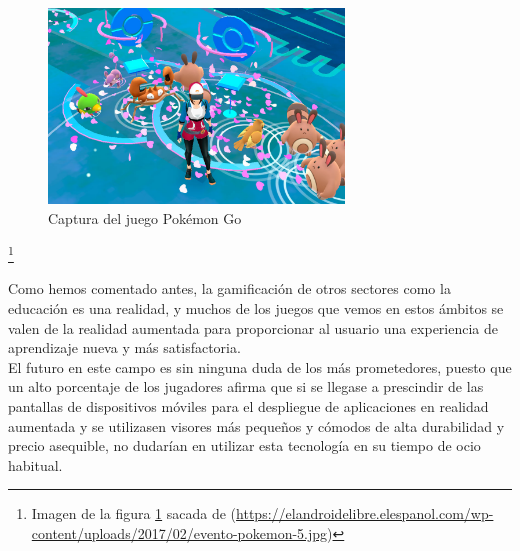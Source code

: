 {{\begin{figure}[H]
     \centering
     \includegraphics[width=0.7\textwidth]{Images/evento-pokemon-5.jpg}
     \caption{Captura del juego Pokémon Go}
     \label{fig:pokemonGo}
 \end{figure}
 {\let\thefootnote\relax\footnote{{Imagen de la figura \ref{fig:pokemonGo} sacada de (\url{https://elandroidelibre.elespanol.com/wp-content/uploads/2017/02/evento-pokemon-5.jpg})}}

Como hemos comentado antes, la gamificación de otros sectores como la educación es una realidad, y muchos de los juegos que vemos en estos ámbitos se valen de la realidad aumentada para proporcionar al usuario una experiencia de aprendizaje nueva y más satisfactoria.\\

El futuro en este campo es sin ninguna duda de los más prometedores, puesto que un alto porcentaje de los jugadores afirma que si se llegase a prescindir de las pantallas de dispositivos móviles para el despliegue de aplicaciones en realidad aumentada y se utilizasen visores más pequeños y cómodos de alta durabilidad y precio asequible, no dudarían en utilizar esta tecnología en su tiempo de ocio habitual.

}}}
